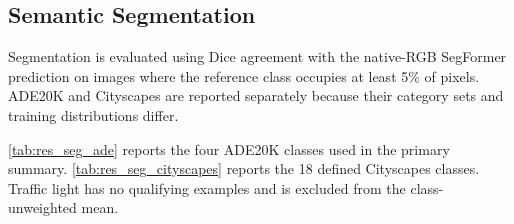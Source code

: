 \subsection{Semantic Segmentation}
\label{sec:res_seg}

Segmentation is evaluated using Dice agreement with the native-RGB SegFormer prediction on images where the reference class occupies at least 5\% of pixels. ADE20K and Cityscapes are reported separately because their category sets and training distributions differ.

\autoref{tab:res_seg_ade} reports the four ADE20K classes used in the primary summary. \autoref{tab:res_seg_cityscapes} reports the 18 defined Cityscapes classes. Traffic light has no qualifying examples and is excluded from the class-unweighted mean.

\begin{table}[!htbp]
\centering
\scriptsize
\setlength{\tabcolsep}{2.5pt}
\caption{SegFormer-B0-ADE20K Dice agreement with native-RGB pseudo-labels. Rows include only test images where the native-RGB reference class covers at least 5\% of pixels.}
\label{tab:res_seg_ade}
\end{table}

